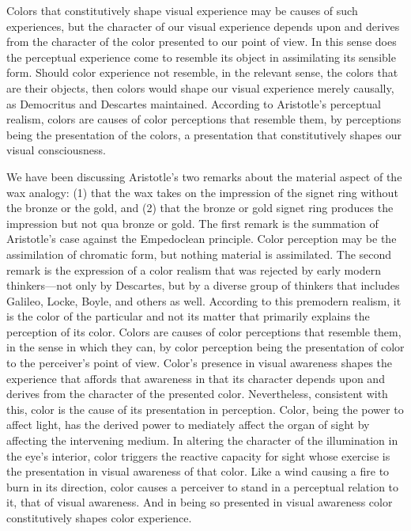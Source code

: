 Colors that constitutively shape visual experience may be causes of such experiences, but the character of our visual experience depends upon and derives from the character of the color presented to our point of view. In this sense does the perceptual experience come to resemble its object in assimilating its sensible form. Should color experience not resemble, in the relevant sense, the colors that are their objects, then colors would shape our visual experience merely causally, as Democritus and Descartes maintained. According to Aristotle's perceptual realism, colors are causes of color perceptions that resemble them, by perceptions being the presentation of the colors, a presentation that constitutively shapes our visual consciousness.

We have been discussing Aristotle's two remarks about the material aspect of the wax analogy: (1) that the wax takes on the impression of the signet ring without the bronze or the gold, and (2) that the bronze or gold signet ring produces the impression but not qua bronze or gold. The first remark is the summation of Aristotle's case against the Empedoclean principle. Color perception may be the assimilation of chromatic form, but nothing material is assimilated. The second remark is the expression of a color realism that was rejected by early modern thinkers---not only by Descartes, but by a diverse group of thinkers that includes Galileo, Locke, Boyle, and others as well. According to this premodern realism, it is the color of the particular and not its matter that primarily explains the perception of its color. Colors are causes of color perceptions that resemble them, in the sense in which they can, by color perception being the presentation of color to the perceiver's point of view. Color's presence in visual awareness shapes the experience that affords that awareness in that its character depends upon and derives from the character of the presented color. Nevertheless, consistent with this, color is the cause of its presentation in perception. Color, being the power to affect light, has the derived power to mediately affect the organ of sight by affecting the intervening medium. In altering the character of the illumination in the eye's interior, color triggers the reactive capacity for sight whose exercise is the presentation in visual awareness of that color. Like a wind causing a fire to burn in its direction, color causes a perceiver to stand in a perceptual relation to it, that of visual awareness. And in being so presented in visual awareness color constitutively shapes color experience.


